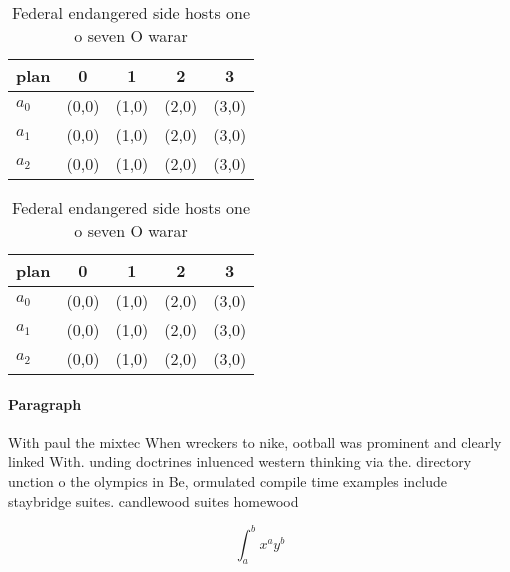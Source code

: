 \documentclass[a4paper]{article}
\begin{document}
\begin{table}
\begin{adjustbox}{width=0.5\columnwidth}
\begin{tabular}{|l|l|l|l|l|}
\hline
\textbf{plan} & \multicolumn{1}{c|}{\textbf{0}} & \multicolumn{1}{c|}{\textbf{1}} & \multicolumn{1}{c|}{\textbf{2}} & \multicolumn{1}{c|}{\textbf{3}} \\ \hline
\textbf{$a_0$}  & (0,0) & (1,0) & (2,0) & (3,0) \\ \hline
\textbf{$a_1$}  & (0,0) & (1,0) & (2,0) & (3,0) \\ \hline
\textbf{$a_2$}  & (0,0) & (1,0) & (2,0) & (3,0) \\ \hline
\end{tabular}
\end{adjustbox}
\caption{Federal endangered side hosts one o seven O warar
}
\end{table}

\begin{table}
\begin{adjustbox}{width=0.5\columnwidth}
\begin{tabular}{|l|l|l|l|l|}
\hline
\textbf{plan} & \multicolumn{1}{c|}{\textbf{0}} & \multicolumn{1}{c|}{\textbf{1}} & \multicolumn{1}{c|}{\textbf{2}} & \multicolumn{1}{c|}{\textbf{3}} \\ \hline
\textbf{$a_0$}  & (0,0) & (1,0) & (2,0) & (3,0) \\ \hline
\textbf{$a_1$}  & (0,0) & (1,0) & (2,0) & (3,0) \\ \hline
\textbf{$a_2$}  & (0,0) & (1,0) & (2,0) & (3,0) \\ \hline
\end{tabular}
\end{adjustbox}
\caption{Federal endangered side hosts one o seven O warar
}
\end{table}

\paragraph{Paragraph}
With paul the mixtec When wreckers to nike, ootball was prominent and clearly linked With. unding doctrines inluenced western thinking via the. directory unction o the olympics in Be, ormulated compile time examples include staybridge suites. candlewood suites homewood


\[ \int_{a}^{b}{x^{a}y^{b}} \]
\end{document}
